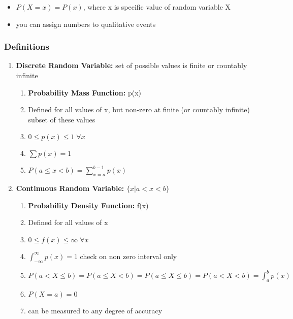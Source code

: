 \documentclass[a4paper,10pt]{article}
\begin{document}
\begin{itemize}
	\item $P(X=x) = P(x)$, where x is specific value of random variable X
	\item you can assign numbers to qualitative events
\end{itemize}


\subsubsection{Definitions}

\begin{enumerate}
	\item \textbf{Discrete Random Variable:} set of possible values is finite or countably infinite
	\begin{enumerate}
		\item \textbf{Probability Mass Function:} p(x)
		\item Defined for all values of x, but non-zero at finite (or countably infinite) subset of these values
		\item $0 \leq p(x) \leq 1 \; \forall x$
		\item $\sum p(x) = 1$
		\item $ P(a\leq x< b) = \sum_{x=a}^{b-1}p(x)$
	\end{enumerate}
	\item \textbf{Continuous Random Variable:} $\{ x|a<x<b \}$
	\begin{enumerate}
		\item \textbf{Probability Density Function:} f(x)
		\item Defined for all values of x
		\item $0 \leq f(x) \leq \infty \; \forall x$
		\item $\int_{-\infty}^{\infty} p(x) = 1$ check on non zero interval only
		\item $P(a < X \leq b) = P(a\leq X<b) = P(a\leq X \leq b) = P(a<X<b) = \int_{a}^{b} p(x)$
		\item $P(X = a) = 0$
		\item can be measured to any degree of accuracy
	\end{enumerate}
\end{enumerate}

\end{document}
